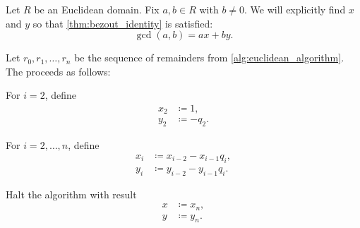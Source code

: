 \begin{algorithm}\label{alg:extended_euclidean_algorithm}
  Let \( R \) be an Euclidean domain. Fix \( a, b \in R \) with \( b \neq 0 \). We will explicitly find \( x \) and \( y \) so that \cref{thm:bezout_identity} is satisfied:
  \begin{equation*}
    \gcd(a, b) = ax + by.
  \end{equation*}

  Let \( r_0, r_1, \ldots, r_n \) be the sequence of remainders from \cref{alg:euclidean_algorithm}. The  proceeds as follows:

  \begin{algenum}
     For \( i = 2 \), define
    \begin{align*}
      x_2 &\coloneqq 1, \\
      y_2 &\coloneqq -q_2.
    \end{align*}

     For \( i = 2, \ldots, n \), define
    \begin{align*}
      x_i &\coloneqq x_{i-2} - x_{i-1} q_i, \\
      y_i &\coloneqq y_{i-2} - y_{i-1} q_i.
    \end{align*}

     Halt the algorithm with result
    \begin{align*}
      x &\coloneqq x_n, \\
      y &\coloneqq y_n.
    \end{align*}
  \end{algenum}
\end{algorithm}
